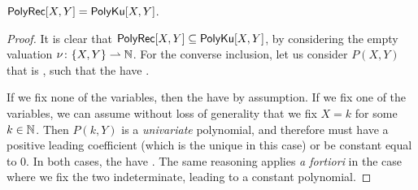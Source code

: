\begin{lemma}
    \label{lem:correct-covered-2}
    $\mathsf{PolyRec}[X,Y] = \mathsf{PolyKu}[X,Y]$.
\end{lemma}
\begin{proof}
    It is clear that $\mathsf{PolyRec}[X,Y] \subseteq \mathsf{PolyKu}[X,Y]$,
    by considering the empty valuation $\nu \colon \mathopen{\{} X,Y \mathclose{\}} \rightharpoonup \mathbb{N}$.
    For the converse inclusion, let us consider $P(X,Y)$
    that is , such that the 
    have .
   

    If we fix none of the variables, then the 
    have  by assumption. If we fix one of the
    variables, we can assume without loss of generality that we 
    fix $X = k$ for some $k \in \mathbb{N}$.
    Then $P(k,Y)$ is a  \emph{univariate} polynomial, 
    and therefore must have a positive leading coefficient
    (which is the unique  in this case)
    or be constant equal to 0. In both cases, the 
    have .
    The same reasoning applies \emph{a fortiori} in the case where
    we fix the two indeterminate, leading to a constant polynomial.
\end{proof}

